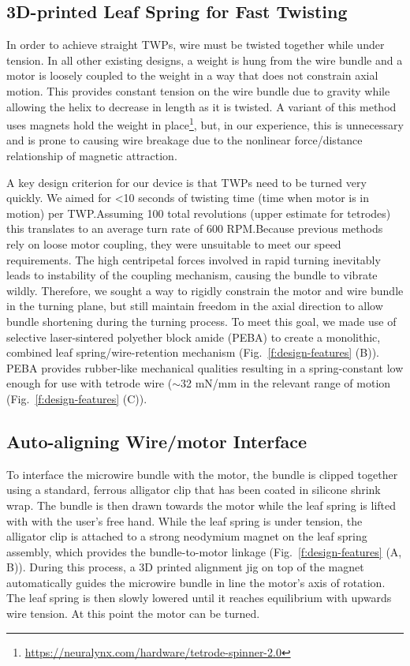 \documentclass[11pt,a4paper]{article}
\begin{document}
\subsection{3D-printed Leaf Spring for Fast Twisting}
In order to achieve straight TWPs, wire must be twisted together while under
tension. In all other existing designs, a weight is hung from the wire bundle
and a motor is loosely coupled to the weight in a way that does not constrain
axial motion. This provides constant tension on the wire bundle due to gravity
while allowing the helix to decrease in length as it is twisted. A variant of
this method uses magnets hold the weight in
place\footnote{\url{https://neuralynx.com/hardware/tetrode-spinner-2.0}}, but,
in our experience, this is unnecessary and is prone to causing wire breakage
due to the nonlinear force/distance relationship of magnetic attraction.

A key design criterion for our device is that TWPs need to be turned very
quickly. We aimed for <10 seconds of twisting time (time when motor is in
motion) per TWP.\@ Assuming 100 total revolutions (upper estimate for tetrodes)
this translates to an average turn rate of 600 RPM.\@ Because previous methods
rely on loose motor coupling, they were unsuitable to meet our speed
requirements. The high centripetal forces involved in rapid turning inevitably
leads to instability of the coupling mechanism, causing the bundle to vibrate
wildly. Therefore, we sought a way to rigidly constrain the motor and wire
bundle in the turning plane, but still maintain freedom in the axial direction
to allow bundle shortening during the turning process. To meet this goal, we
made use of selective laser-sintered polyether block amide (PEBA) to create a
monolithic, combined leaf spring/wire-retention mechanism
(Fig.~\ref{f:design-features} (B)). PEBA provides rubber-like mechanical
qualities resulting in a spring-constant low enough for use with tetrode wire
($\sim$32 mN/mm in the relevant range of motion (Fig.~\ref{f:design-features} (C)).

\subsection{Auto-aligning Wire/motor Interface}
To interface the microwire bundle with the motor, the bundle is clipped
together using a standard, ferrous alligator clip that has been coated in
silicone shrink wrap. The bundle is then drawn towards the motor while the leaf
spring is lifted with with the user's free hand. While the leaf spring is under
tension, the alligator clip is attached to a strong neodymium magnet on the
leaf spring assembly, which provides the bundle-to-motor linkage
(Fig.~\ref{f:design-features} (A, B)). During this process, a 3D printed
alignment jig on top of the magnet  automatically guides the microwire bundle
in line the motor's axis of rotation. The leaf spring is then slowly lowered
until it reaches equilibrium with upwards wire tension. At this point the motor
can be turned.
\end{document}
